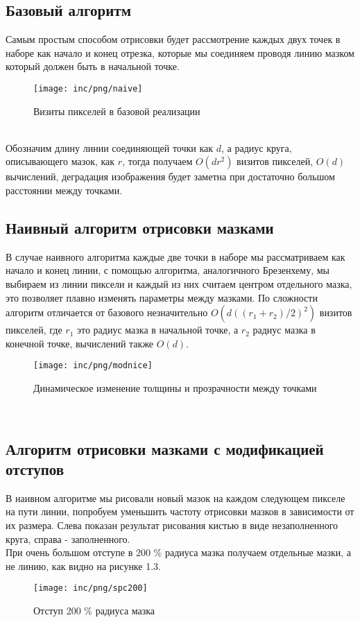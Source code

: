 \subsection{Базовый алгоритм}
Самым простым способом отрисовки будет рассмотрение каждых двух точек в наборе как начало и конец отрезка, которые мы соединяем проводя линию мазком который должен быть в начальной точке.\\
\begin{figure}
	[ht]
	\centering
	\texttt{[image: inc/png/naive]}
	\caption{Визиты пикселей в базовой реализации}
	\label{fig:fig01}
\end{figure}\\
Обозначим длину линии соединяющей точки как $d$, а радиус круга, описывающего мазок, как $r$, тогда получаем $O(dr^2)$ визитов пикселей, $O(d)$ вычислений, деградация изображения будет заметна при достаточно большом расстоянии между точками.\\


\subsection{Наивный алгоритм отрисовки мазками}
В случае наивного алгоритма каждые две точки в наборе мы рассматриваем как начало и конец линии, с помощью алгоритма, аналогичного Брезенхему, мы выбираем из линии пиксели и каждый из них считаем центром отдельного мазка, это позволяет плавно изменять параметры между мазками. По сложности алгоритм отличается от базового незначительно $O(d((r_1+r_2)/2)^2)$ визитов пикселей, где $r_1$ это радиус мазка в начальной точке, а $r_2$ радиус мазка в конечной точке, вычислений также $O(d)$.\cite{vc85}\\
\begin{figure}
	[ht]
	\centering
	\texttt{[image: inc/png/modnice]}
	\caption{Динамическое изменение толщины и прозрачности между точками}
	\label{fig:fig1}
\end{figure}\\
\subsection{Алгоритм отрисовки мазками с модификацией отступов}
В наивном алгоритме мы рисовали новый мазок на каждом следующем пикселе на пути линии, попробуем уменьшить частоту отрисовки мазков в зависимости от их размера. Слева показан результат рисования кистью в виде незаполненного круга, справа - заполненного. \\
При очень большом отступе в 200 \% радиуса мазка получаем отдельные мазки, а не линию, как видно на рисунке 1.3.
\begin{figure}
	[ht]
	\centering
	\texttt{[image: inc/png/spc200]}
	\caption{Отступ 200 \% радиуса мазка}
	\label{fig:fig02}
\end{figure}\\


